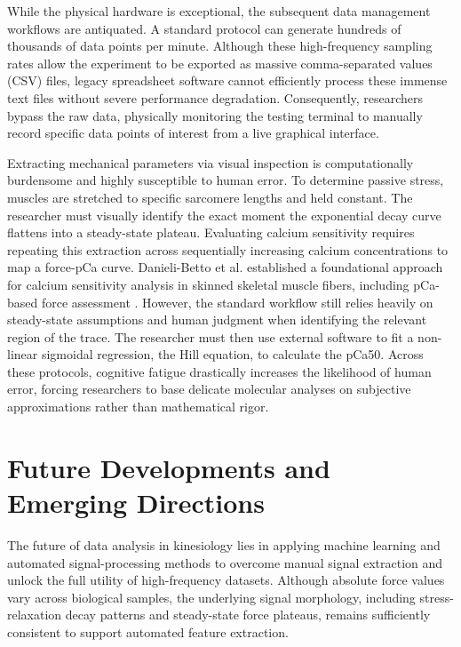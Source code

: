 \documentclass[jou]{apa7}
\begin{document}
While the physical hardware is exceptional, the subsequent data management workflows are antiquated. A standard protocol can generate hundreds of thousands of data points per minute. Although these high-frequency sampling rates allow the experiment to be exported as massive comma-separated values (CSV) files, legacy spreadsheet software cannot efficiently process these immense text files without severe performance degradation. Consequently, researchers bypass the raw data, physically monitoring the testing terminal to manually record specific data points of interest from a live graphical interface.

Extracting mechanical parameters via visual inspection is computationally burdensome and highly susceptible to human error. To determine passive stress, muscles are stretched to specific sarcomere lengths and held constant. The researcher must visually identify the exact moment the exponential decay curve flattens into a steady-state plateau. Evaluating calcium sensitivity requires repeating this extraction across sequentially increasing calcium concentrations to map a force-pCa curve. Danieli-Betto et al. established a foundational approach for calcium sensitivity analysis in skinned skeletal muscle fibers, including pCa-based force assessment \parencite{DanieliBetto1990}. However, the standard workflow still relies heavily on steady-state assumptions and human judgment when identifying the relevant region of the trace. The researcher must then use external software to fit a non-linear sigmoidal regression, the Hill equation, to calculate the pCa50. Across these protocols, cognitive fatigue drastically increases the likelihood of human error, forcing researchers to base delicate molecular analyses on subjective approximations rather than mathematical rigor.

\section{Future Developments and Emerging Directions}

The future of data analysis in kinesiology lies in applying machine learning and automated signal-processing methods to overcome manual signal extraction and unlock the full utility of high-frequency datasets. Although absolute force values vary across biological samples, the underlying signal morphology, including stress-relaxation decay patterns and steady-state force plateaus, remains sufficiently consistent to support automated feature extraction.
\end{document}
